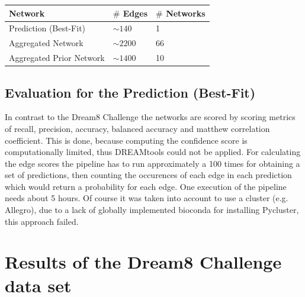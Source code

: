 \begin{table}[H]
\begin{center}
\begin{tabular}{l|l|l}
\toprule 
Network & $\# $ Edges & $\# $ Networks\\
 \hline\hline
Prediction (Best-Fit) & $\sim 140$ & 1\\
\rowcolor{black!10} Aggregated Network & $\sim 2200 $ & 66\\
Aggregated Prior Network & $\sim 1400$ & 10\\
\bottomrule
\end{tabular}
\end{center}
\end{table} 

\subsection*{Evaluation for the Prediction (Best-Fit)}
In contrast to the Dream8 Challenge the networks are scored by scoring metrics of recall, precision, accuracy, balanced accuracy and matthew correlation coefficient. This is done, because computing the confidence score is computationally limited, thus DREAMtools could not be applied. 
For calculating the edge scores the pipeline has to run approximately a 100 times for obtaining a set of predictions, then counting the occurences of each edge in each prediction which would return a probability for each edge. One execution of the pipeline needs about 5 hours. Of course it was taken into account to use a cluster (e.g. Allegro), due to a lack of globally implemented bioconda for installing Pycluster, this approach failed. 


\newpage
\section{Results of the Dream8 Challenge data set}
